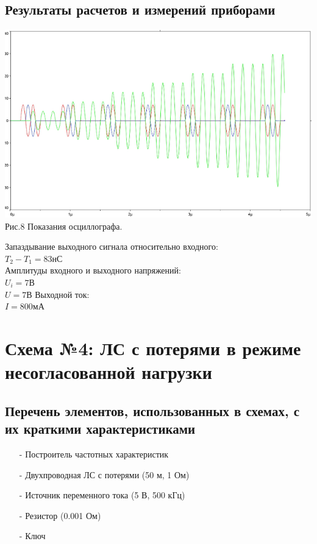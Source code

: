 \documentclass[11pt]{article}
\begin{document}
\subsection{Результаты расчетов и измерений приборами}
\begin{center}
    \includegraphics[width=1\linewidth]{img/third1.png}
        Рис.8 Показания осциллографа.
\end{center}
Запаздывание выходного сигнала относительно входного:\\
$T_2 - T_1 = 83$нС\\
Амплитуды входного и выходного напряжений:\\
$U_i = 7$В\\
$U = 7$В
Выходной ток:\\
$I = 800$мА\\

\newpage
\section{ Схема №4: ЛС с потерями в режиме несогласованной нагрузки}
\subsection{Перечень элементов, использованных в схемах, с
их краткими характеристиками}
\begin{itemize}    
    \item[-] Построитель частотных характеристик
    \item[-] Двухпроводная ЛС с потерями (50 м, 1 Ом)
    \item[-] Источник переменного тока (5 В, 500 кГц)
    \item[-] Резистор (0.001 Ом)
    \item[-] Ключ
\end{itemize}
\end{document}
